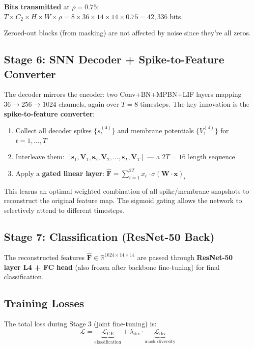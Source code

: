 \documentclass[11pt]{article}
\begin{document}
\textbf{Bits transmitted} at $\rho{=}0.75$: $T \times C_2 \times H \times W \times \rho = 8 \times 36 \times 14 \times 14 \times 0.75 = 42{,}336$ bits.

Zeroed-out blocks (from masking) are not affected by noise since they're all zeros.

\subsection{Stage 6: SNN Decoder + Spike-to-Feature Converter}

The decoder mirrors the encoder: two Conv+BN+MPBN+LIF layers mapping $36 \to 256 \to 1024$ channels, again over $T{=}8$ timesteps. The key innovation is the \textbf{spike-to-feature converter}:

\begin{enumerate}[nosep]
    \item Collect all decoder spikes $\{s_t^{(4)}\}$ and membrane potentials $\{V_t^{(4)}\}$ for $t=1,\ldots,T$
    \item Interleave them: $[\mathbf{s}_1, \mathbf{V}_1, \mathbf{s}_2, \mathbf{V}_2, \ldots, \mathbf{s}_T, \mathbf{V}_T]$ --- a $2T{=}16$ length sequence
    \item Apply a \textbf{gated linear layer}: $\hat{\mathbf{F}} = \sum_{i=1}^{2T} x_i \cdot \sigma(\mathbf{W} \cdot \mathbf{x})_i$
\end{enumerate}

This learns an optimal weighted combination of all spike/membrane snapshots to reconstruct the original feature map. The sigmoid gating allows the network to selectively attend to different timesteps.

\subsection{Stage 7: Classification (ResNet-50 Back)}

The reconstructed features $\hat{\mathbf{F}} \in \mathbb{R}^{1024 \times 14 \times 14}$ are passed through \textbf{ResNet-50 layer L4 + FC head} (also frozen after backbone fine-tuning) for final classification.

\subsection{Training Losses}

The total loss during Stage 3 (joint fine-tuning) is:
\[
\mathcal{L} = \underbrace{\mathcal{L}_{\text{CE}}}_{\text{classification}} + \lambda_{\text{div}} \cdot \underbrace{\mathcal{L}_{\text{div}}}_{\text{mask diversity}}
\]
\end{document}
